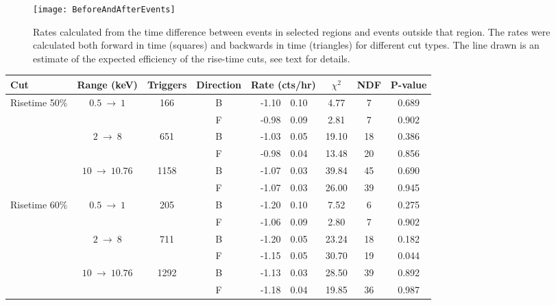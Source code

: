 			\begin{figure}
				\centering
				\texttt{[image: BeforeAndAfterEvents]}
				\caption[Rates calculated from the time difference between events in selected regions]
				{Rates calculated from the time difference between events in selected regions and events outside that region.  The rates were calculated both forward
				in time (squares) and backwards in time (triangles) for different cut types.  The line drawn is an estimate of the expected efficiency of the rise-time cuts, 
				see text for details.}
				\label{fig:BeGeForBack}
			\end{figure}	
			
			\begin{table} \scriptsize
				\centering
				\renewcommand{\arraystretch}{0.75}
				\begin{tabular}{l  c  c  c  r@{$~\pm~$}l  c  c  c } 
					Cut & Range (keV) & Triggers & Direction & \multicolumn{2}{c}{Rate (cts/hr)} & $\chi^2$ & NDF & P-value  \\
					\hline
				\multirow{6}{*}{Risetime 50\%}& \multirow{2}{*}{$0.5~\to~1$} & \multirow{2}{*}{166}	& B & -1.10 & 0.10 & 4.77 & 7 & 0.689\\
					& & & F & -0.98 & 0.09 & 2.81 & 7 & 0.902\\
				& \multirow{2}{*}{$2~\to~8$} & \multirow{2}{*}{651}	& B & -1.03 & 0.05 & 19.10 & 18 & 0.386\\
					& & & F & -0.98 & 0.04 & 13.48 & 20 & 0.856\\
				& \multirow{2}{*}{$10~\to~10.76$} & \multirow{2}{*}{1158}	& B & -1.07 & 0.03 & 39.84 & 45 & 0.690\\
					& & & F & -1.07 & 0.03 & 26.00 & 39 & 0.945\\
				\hline
				
				\multirow{6}{*}{Risetime 60\%}& \multirow{2}{*}{$0.5~\to~1$} & \multirow{2}{*}{205}	& B & -1.20 & 0.10 & 7.52 & 6 & 0.275\\
					& & & F & -1.06 & 0.09 & 2.80 & 7 & 0.902\\
				& \multirow{2}{*}{$2~\to~8$} & \multirow{2}{*}{711}	& B & -1.20 & 0.05 & 23.24 & 18 & 0.182\\
					& & & F & -1.15 & 0.05 & 30.70 & 19 & 0.044\\
				& \multirow{2}{*}{$10~\to~10.76$} & \multirow{2}{*}{1292}	& B & -1.13 & 0.03 & 28.50 & 39 & 0.892\\
					& & & F & -1.18 & 0.04 & 19.85 & 36 & 0.987\\
				\hline
				

\end{tabular}
\end{table}
